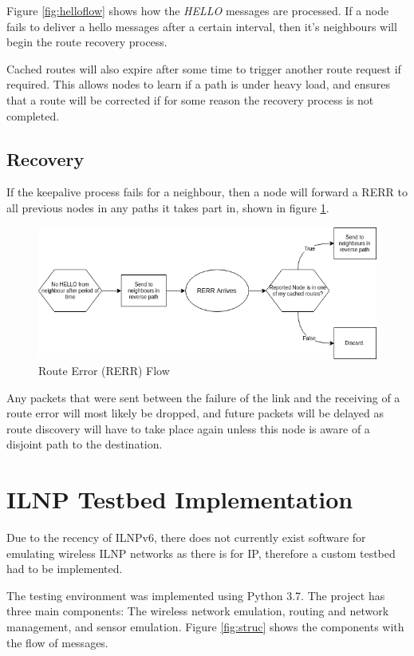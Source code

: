 \documentclass[12pt]{article}
\begin{document}
Figure \ref{fig:helloflow} shows how the \emph{HELLO} messages are processed. If a node fails to deliver a hello messages after a certain interval, then it's neighbours will begin the route recovery process.

Cached routes will also expire after some time to trigger another route request if required. This allows nodes to learn if a path is under heavy load, and ensures that a route will be corrected if for some reason the recovery process is not completed. 

\subsection{Recovery}

If the keepalive process fails for a neighbour, then a node will forward a RERR to all previous nodes in any paths it takes part in, shown in figure \ref{fig:rerrflow}.

\begin{figure}[h]
	\centering
	\includegraphics[width=\linewidth]{images/rerrflow}
	\caption{Route Error (RERR) Flow}
	\label{fig:rerrflow}
\end{figure}

Any packets that were sent between the failure of the link and the receiving of a route error will most likely be dropped, and future packets will be delayed as route discovery will have to take place again unless this node is aware of a disjoint path to the destination.

\FloatBarrier
\pagebreak
\section{ILNP Testbed Implementation}

Due to the recency of ILNPv6, there does not currently exist software for emulating wireless ILNP networks as there is for IP, therefore a custom testbed had to be implemented.  

The testing environment was implemented using Python 3.7. The project has three main components: The wireless network emulation, routing and network management, and sensor emulation. Figure \ref{fig:struc} shows the components with the flow of messages.
\end{document}
